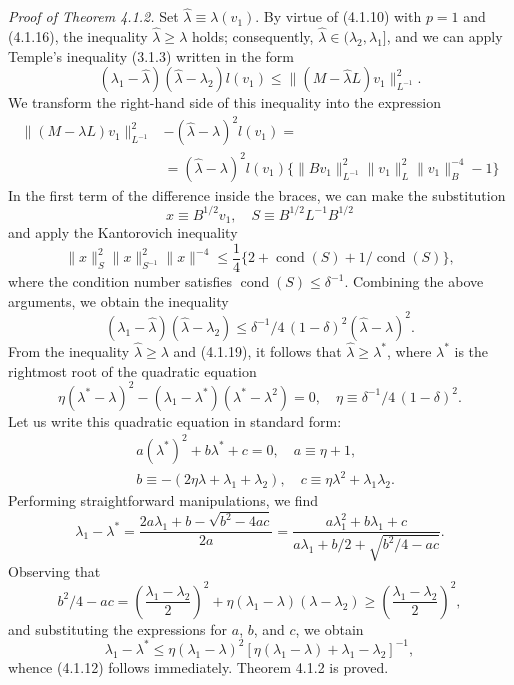 \documentclass[11pt,oneside]{book}
\begin{document}
\textit{Proof of Theorem 4.1.2.} Set $\hat{\lambda} \equiv \lambda(v_1)$. By virtue of (4.1.10) with $p = 1$ and (4.1.16), the inequality $\hat{\lambda} \geqslant \lambda$ holds; consequently, $\hat{\lambda} \in (\lambda_2, \lambda_1]$, and we can apply Temple's inequality (3.1.3) written in the form
\[
(\lambda_1 - \hat{\lambda})(\hat{\lambda} - \lambda_2) l(v_1) \leqslant \| (M - \hat{\lambda} L) v_1 \|_{L^{-1}}^2.
\]
We transform the right-hand side of this inequality into the expression
\[
\begin{aligned}
\| (M - \lambda L) v_1 \|_{L^{-1}}^2 &- (\hat{\lambda} - \lambda)^2 l(v_1) = \\
&= (\hat{\lambda} - \lambda)^2 l(v_1) \{ \| B v_1 \|_{L^{-1}}^2 \| v_1 \|_L^2 \| v_1 \|_B^{-4} - 1 \}
\end{aligned}
\]
In the first term of the difference inside the braces, we can make the substitution
\[
x \equiv B^{1/2} v_1, \quad S \equiv B^{1/2} L^{-1} B^{1/2}
\]
and apply the Kantorovich inequality \citep[p.~366]{GlazmanLyubich1969}
\[
\|x\|_S^2 \|x\|_{S^{-1}}^2 \|x\|^{-4} \leqslant \frac{1}{4} \{ 2 + \operatorname{cond}(S) + 1 / \operatorname{cond}(S) \},
\]
where the condition number satisfies $\operatorname{cond}(S) \leqslant \delta^{-1}$. Combining the above arguments, we obtain the inequality
\[
(\lambda_1 - \hat{\lambda})(\hat{\lambda} - \lambda_2) \leqslant \delta^{-1} / 4 \, (1 - \delta)^2 (\hat{\lambda} - \lambda)^2. \tag{4.1.19}
\]
From the inequality $\hat{\lambda} \geqslant \lambda$ and (4.1.19), it follows that $\hat{\lambda} \geqslant \lambda^*$, where $\lambda^*$ is the rightmost root of the quadratic equation
\[
\eta (\lambda^* - \lambda)^2 - (\lambda_1 - \lambda^*)(\lambda^* - \lambda^2) = 0, \quad \eta \equiv \delta^{-1} / 4 \, (1 - \delta)^2. %
\]
Let us write this quadratic equation in standard form:
\[
\begin{aligned}
&a (\lambda^*)^2 + b \lambda^* + c = 0, \quad a \equiv \eta + 1, \\
&b \equiv - (2\eta\lambda + \lambda_1 + \lambda_2), \quad c \equiv \eta \lambda^2 + \lambda_1 \lambda_2.
\end{aligned}
\]
Performing straightforward manipulations, we find
\[
\lambda_1 - \lambda^* = \frac{2a\lambda_1 + b - \sqrt{b^2 - 4ac}}{2a} = \frac{a\lambda_1^2 + b\lambda_1 + c}{a\lambda_1 + b/2 + \sqrt{b^2/4 - ac}}.
\]
Observing that
\[
b^2 / 4 - ac = \left( \frac{\lambda_1 - \lambda_2}{2} \right)^2 + \eta (\lambda_1 - \lambda)(\lambda - \lambda_2) \geqslant \left( \frac{\lambda_1 - \lambda_2}{2} \right)^2,
\]
and substituting the expressions for $a$, $b$, and $c$, we obtain
\[
\lambda_1 - \lambda^* \leqslant \eta (\lambda_1 - \lambda)^2 [ \eta (\lambda_1 - \lambda) + \lambda_1 - \lambda_2 ]^{-1},
\]
whence (4.1.12) follows immediately. Theorem 4.1.2 is proved.
\end{document}
